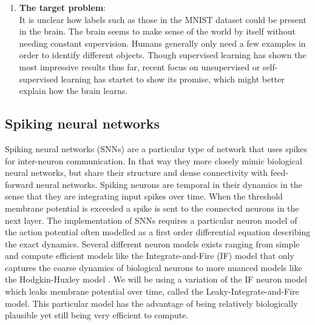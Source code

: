 \documentclass[a4paper,11pt]{article} %
\begin{document}
\begin{enumerate}
  \item \textbf{The target problem}: \vspace{5pt} \\
  It is unclear how labels such as those in the MNIST dataset could be present in the brain. The brain seems to make sense of the world by itself without needing constant supervision. Humans generally only need a few examples in order to identify different objects. Though supervised learning has shown the most impressive results thus far, recent focus on unsupervised or self-supervised learning has startet to show its promise, which might better explain how the brain learns. 
\end{enumerate}




\newpage

\subsection{Spiking neural networks}
Spiking neural networks (SNNs) are a particular type of network that uses spikes for inter-neuron communication. In that way they more closely mimic biological neural networks, but share their structure and dense connectivity with feed-forward neural networks. Spiking neurons are temporal in their dynamics in the sense that they are integrating input spikes over time. When the threshold membrane potential is exceeded a spike is sent to the connected neurons in the next layer. The implementation of SNNs requires a particular neuron model of the action potential often modelled as a first order differential equation describing the exact dynamics. Several different neuron models exists ranging from simple and compute efficient models like the Integrate-and-Fire (IF) model that only captures the coarse dynamics of biological neurons to more nuanced models like the Hodgkin-Huxley model \cite{Hodgkin1952}. We will be using a variation of the IF neuron model which leaks membrane potential over time, called the Leaky-Integrate-and-Fire model. This particular model has the advantage of being relatively biologically plausible yet still being very efficient to compute. 
\end{document}
